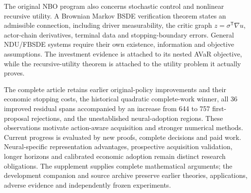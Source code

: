 The original NBO program also concerns stochastic control and nonlinear
recursive utility. A Brownian Markov BSDE verification theorem states an
admissible connection, including driver measurability, the critic graph
$z=\sigma^{\mathsf T}\nabla u$, actor-chain derivatives, terminal data and
stopping-boundary errors. General NDU/FBSDE systems require their own existence,
information and objective assumptions. The investment evidence is attached to
its nested AVaR objective, while the recursive-utility theorem is attached to
the utility problem it actually proves.

The complete article retains earlier original-policy improvements and their
economic stopping costs, the historical quadratic complete-work winner, all
36 improved residual spans accompanied by an increase from 644 to 757
first-proposal rejections, and the unestablished neural-adoption regions.
These observations motivate action-aware acquisition and stronger numerical
methods. Current progress is evaluated by new proofs, complete decisions and
paid work. Neural-specific representation advantages, prospective acquisition
validation, longer horizons and calibrated economic adoption remain distinct
research obligations. The supplement supplies complete mathematical arguments;
the development companion and source archive preserve earlier theories,
applications, adverse evidence and independently frozen experiments.
